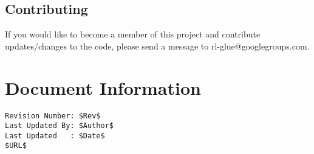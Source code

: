 \documentclass[11pt]{article}
\begin{document}
\subsection{Contributing}
If you would like to become a member of this project and contribute updates/changes to the code, please send a message to rl-glue@googlegroups.com.


\section*{Document Information}
\begin{verbatim}
Revision Number: $Rev$
Last Updated By: $Author$
Last Updated   : $Date$
$URL$
\end{verbatim}
\end{document}
